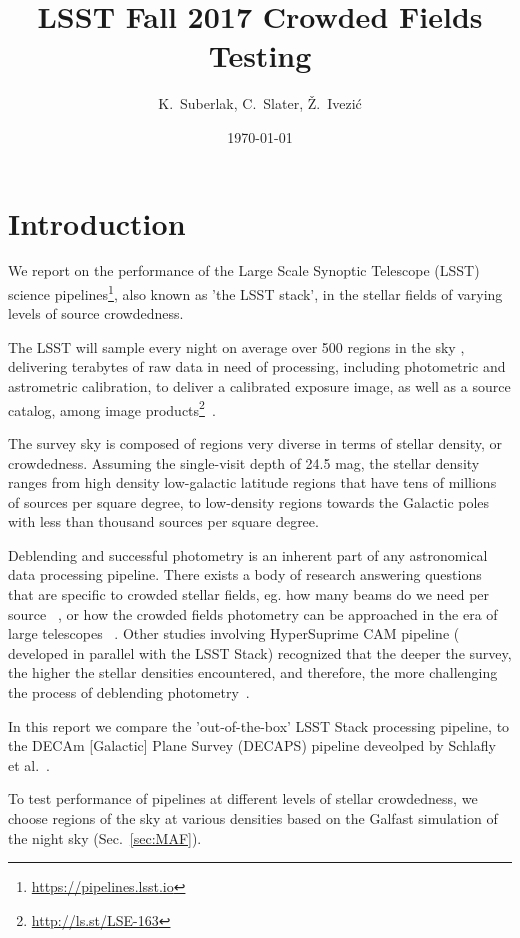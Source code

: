 \documentclass[DM,lsstdraft,toc,usenatbib,authoryear]{lsstdoc}
\title[Crowded fields]{LSST Fall 2017 Crowded Fields Testing}
\author{
K.~Suberlak, C.~Slater, \v{Z}.~Ivezi\'c}
\date{\today}
\begin{document}
\maketitle

\section{Introduction}

We report on the performance of the Large Scale Synoptic Telescope (LSST) science pipelines\footnote{\url{https://pipelines.lsst.io}}, also known as 'the LSST stack', in the stellar fields of varying levels of source crowdedness.

The LSST will sample every night on average over 500  regions in the sky , delivering terabytes of raw data in need of processing, including photometric  and astrometric calibration, to deliver a calibrated exposure image, as well as a source catalog, among image products\footnote{\url{http://ls.st/LSE-163}}~\cite{narayan2018}.

The survey sky is composed of regions very diverse in terms of stellar density, or crowdedness. Assuming the single-visit depth of 24.5 mag, the stellar density ranges from high density low-galactic latitude regions that have tens of millions of sources per square degree, to low-density regions towards the Galactic poles with less than thousand sources per square degree.

Deblending and successful photometry is an inherent part of any astronomical data processing pipeline.  There exists a body of research answering questions that are specific to crowded stellar fields, eg. how many beams do we need per source ~\citep{hogg2001}, or how  the crowded fields photometry can be approached in the era of large telescopes ~\cite{olsen2003}. Other studies involving HyperSuprime CAM pipeline ( developed in parallel with the LSST Stack) recognized that the deeper the survey, the higher the stellar densities encountered, and therefore, the more challenging the process of deblending photometry~\cite{bosch2017}.

In this report we compare the 'out-of-the-box' LSST Stack processing pipeline, to the DECAm [Galactic] Plane Survey (DECAPS) pipeline deveolped by Schlafly et al.~\cite{schlafly2017}.

To test performance of pipelines at different levels of stellar crowdedness, we choose regions of the sky at various densities based on the Galfast simulation of the night sky (Sec.~\ref{sec:MAF}).
\end{document}
